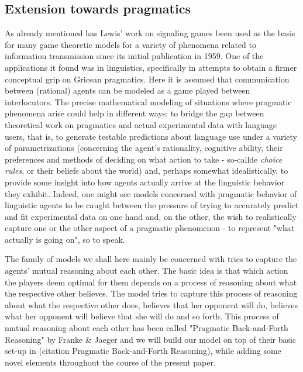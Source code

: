 \documentclass{article}
\begin{document}
\subsection{Extension towards pragmatics}
As already mentioned has Lewis' work on signaling games been used as the basis for many game theoretic models for a variety of phenomena related to information transmission since its initial publication in 1959. One of the applications it found was in linguistics, specifically in attempts to obtain a firmer conceptual grip on Gricean pragmatics. Here it is assumed that communication between (rational) agents can be modeled as a game played between interlocutors. The precise mathematical modeling of situations where pragmatic phenomena arise could help in different ways: to bridge the gap between theoretical work on pragmatics and actual experimental data with language users, that is, to generate testable predictions about language use under a variety of parametrizations (concerning the agent's rationality, cognitive ability, their preferences and methods of deciding on what action to take - so-callde \textit{choice rules}, or their beliefs about the world) and, perhaps somewhat idealistically, to provide some insight into how agents actually arrive at the linguistic behavior they exhibit. Indeed, one might see models concerned with pragmatic behavior of linguistic agents to be caught between the pressure of trying to accurately predict and fit experimental data on one hand and, on the other, the wish to realistically capture one or the other aspect of a pragmatic phenomenon - to represent "what actually is going on", so to speak.

The family of models we shall here mainly be concerned with tries to capture the agents' mutual reasoning about each other. The basic idea is that which action the players deem optimal for them depends on a process of reasoning about what the respective other believes. The model tries to capture this process of reasoning about what the respective other does, believes that her opponent will do, believes what her opponent will believe that she will do and so forth. This process of mutual reasoning about each other has been called "Pragmatic Back-and-Forth Reasoning" by Franke \& Jaeger and we will build our model on top of their basic set-up in (citation Pragmatic Back-and-Forth Reasoning), while adding some novel elements throughout the course of the present paper.
\end{document}
